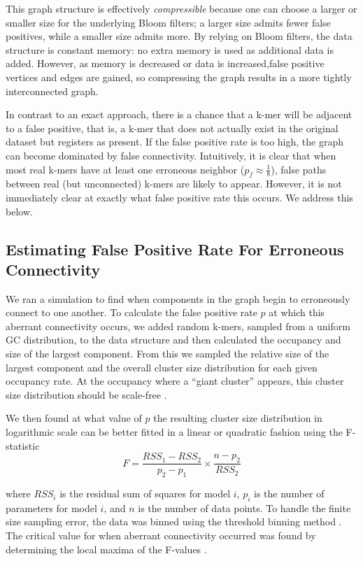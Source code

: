 \documentclass[12pt]{article} \usepackage{simplemargins}
\begin{document}
This graph structure is effectively {\em compressible}
because one can choose a larger
or smaller size for the underlying Bloom filters; a larger size admits fewer
false positives, while a smaller size admits more. By relying on Bloom
filters, the data structure is constant memory: no extra memory is
used as additional data is added. However, as memory is decreased or data
is increased,false positive vertices and edges are gained, so
compressing the graph results in a more tightly interconnected graph.

In contrast to an exact approach, there is a chance that a k-mer 
will be adjacent to a false positive,
that is, a k-mer
that does not actually exist in the original dataset but registers as present.
If the false positive rate is too high, the 
graph can become dominated by false connectivity. 
Intuitively, it is clear that when most real k-mers
have at least one erroneous neighbor ($p_f \approx \frac{1}{8}$), 
false paths between real (but unconnected) k-mers are likely to 
appear. However, it is not immediately clear at exactly what 
false positive rate this occurs. We address this below.  %

\subsection{Estimating False Positive Rate For Erroneous Connectivity}
We ran a simulation to find when components in the graph 
begin to erroneously connect to one another.
To calculate the false positive rate $p$ at which this aberrant 
connectivity occurs, 
we added random k-mers, sampled from a uniform GC distribution, to the data structure 
and then calculated the occupancy and size of 
the largest 
component. From this we sampled the relative size of 
the largest component and the overall cluster size distribution for each
given occupancy rate.
At the occupancy where a ``giant cluster'' appears, this cluster size distribution 
should be scale-free \cite{stauffer1979scaling}. 

We then found at what value of $p$ the resulting 
cluster size distribution in logarithmic 
scale can be better fitted in a linear or quadratic fashion using 
the F-statistic
\newline
\newline
\begin{displaymath}
F=\frac{RSS_1-RSS_2}{p_2-p_1} \times \frac{n - p_2}{RSS_2}
\end{displaymath}

where $RSS_i$ is the residual sum of squares for model $i$, $p_i$ is 
the number of parameters for model $i$, and $n$ is the number of data 
points. To handle the finite size sampling error, the data was binned using the 
threshold binning method \cite{adami2002critical}. The critical value for 
when aberrant connectivity occurred was found by determining the local maxima 
of the F-values \cite{wald43}.
\end{document}
